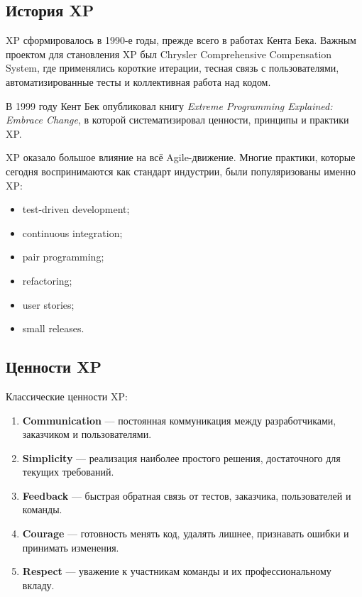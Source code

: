 \documentclass[12pt,a4paper]{article}
\begin{document}
\subsection{История XP}

XP сформировалось в 1990-е годы, прежде всего в работах Кента Бека. Важным проектом для становления XP был Chrysler Comprehensive Compensation System, где применялись короткие итерации, тесная связь с пользователями, автоматизированные тесты и коллективная работа над кодом.

В 1999 году Кент Бек опубликовал книгу \textit{Extreme Programming Explained: Embrace Change}, в которой систематизировал ценности, принципы и практики XP.

XP оказало большое влияние на всё Agile-движение. Многие практики, которые сегодня воспринимаются как стандарт индустрии, были популяризованы именно XP:
\begin{itemize}
    \item test-driven development;
    \item continuous integration;
    \item pair programming;
    \item refactoring;
    \item user stories;
    \item small releases.
\end{itemize}

\subsection{Ценности XP}

Классические ценности XP:

\begin{enumerate}
    \item \textbf{Communication} --- постоянная коммуникация между разработчиками, заказчиком и пользователями.
    \item \textbf{Simplicity} --- реализация наиболее простого решения, достаточного для текущих требований.
    \item \textbf{Feedback} --- быстрая обратная связь от тестов, заказчика, пользователей и команды.
    \item \textbf{Courage} --- готовность менять код, удалять лишнее, признавать ошибки и принимать изменения.
    \item \textbf{Respect} --- уважение к участникам команды и их профессиональному вкладу.
\end{enumerate}
\end{document}
